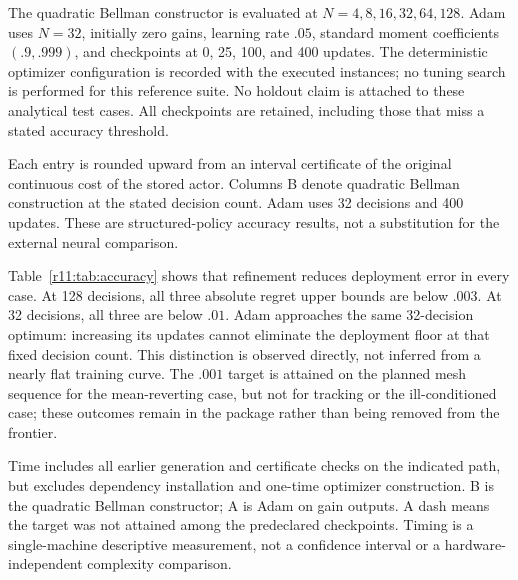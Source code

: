 The quadratic Bellman constructor is evaluated at $N=4,8,16,32,64,128$. Adam uses $N=32$, initially zero gains, learning rate $.05$, standard moment coefficients $(.9,.999)$, and checkpoints at 0, 25, 100, and 400 updates. The deterministic optimizer configuration is recorded with the executed instances; no tuning search is performed for this reference suite. No holdout claim is attached to these analytical test cases. All checkpoints are retained, including those that miss a stated accuracy threshold.

\begin{table}[t]\centering\small
\caption{Absolute continuous-model regret: outward upper endpoints}\label{r11:tab:accuracy}

\par\smallskip\footnotesize Each entry is rounded upward from an interval certificate of the original continuous cost of the stored actor. Columns B denote quadratic Bellman construction at the stated decision count. Adam uses 32 decisions and 400 updates. These are structured-policy accuracy results, not a substitution for the external neural comparison.
\end{table}

Table~\ref{r11:tab:accuracy} shows that refinement reduces deployment error in every case. At 128 decisions, all three absolute regret upper bounds are below $.003$. At 32 decisions, all three are below $.01$. Adam approaches the same 32-decision optimum: increasing its updates cannot eliminate the deployment floor at that fixed decision count. This distinction is observed directly, not inferred from a nearly flat training curve. The $.001$ target is attained on the planned mesh sequence for the mean-reverting case, but not for tracking or the ill-conditioned case; these outcomes remain in the package rather than being removed from the frontier.

\begin{table}[t]\centering\small
\caption{First certified attainment on the recorded computation paths}\label{r11:tab:frontier}

\par\smallskip\footnotesize Time includes all earlier generation and certificate checks on the indicated path, but excludes dependency installation and one-time optimizer construction. B is the quadratic Bellman constructor; A is Adam on gain outputs. A dash means the target was not attained among the predeclared checkpoints. Timing is a single-machine descriptive measurement, not a confidence interval or a hardware-independent complexity comparison.
\end{table}


